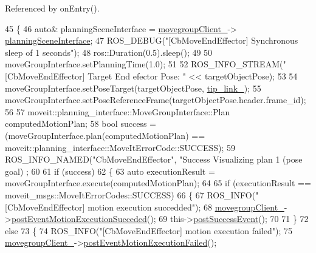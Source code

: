Referenced by on\+Entry().


\begin{DoxyCode}
45 \{
46   \textcolor{keyword}{auto}& planningSceneInterface = \hyperlink{classcl__move__group__interface_1_1CbMoveEndEffector_a86583cb37788b461fc8bb38102a8c0ed}{movegroupClient\_}->
      \hyperlink{classcl__move__group__interface_1_1ClMoveGroup_a11bfab580f36e2ad32c9b37d6f58f44c}{planningSceneInterface};
47   ROS\_DEBUG(\textcolor{stringliteral}{"[CbMoveEndEffector] Synchronous sleep of 1 seconds"});
48   ros::Duration(0.5).sleep();
49 
50   moveGroupInterface.setPlanningTime(1.0);
51 
52   ROS\_INFO\_STREAM(\textcolor{stringliteral}{"[CbMoveEndEffector] Target End efector Pose: "} << targetObjectPose);
53 
54   moveGroupInterface.setPoseTarget(targetObjectPose, \hyperlink{classcl__move__group__interface_1_1CbMoveEndEffector_a4b6f4468b2db565a07119ac90c067436}{tip\_link\_});
55   moveGroupInterface.setPoseReferenceFrame(targetObjectPose.header.frame\_id);
56 
57   moveit::planning\_interface::MoveGroupInterface::Plan computedMotionPlan;
58   \textcolor{keywordtype}{bool} success = (moveGroupInterface.plan(computedMotionPlan) == 
      moveit::planning\_interface::MoveItErrorCode::SUCCESS);
59   ROS\_INFO\_NAMED(\textcolor{stringliteral}{"CbMoveEndEffector"}, \textcolor{stringliteral}{"Success Visualizing plan 1 (pose goal) %
      ;
60 
61   \textcolor{keywordflow}{if} (success)
62   \{
63     \textcolor{keyword}{auto} executionResult = moveGroupInterface.execute(computedMotionPlan);
64 
65     \textcolor{keywordflow}{if} (executionResult == moveit\_msgs::MoveItErrorCodes::SUCCESS)
66     \{
67       ROS\_INFO(\textcolor{stringliteral}{"[CbMoveEndEffector] motion execution succedded"});
68       \hyperlink{classcl__move__group__interface_1_1CbMoveEndEffector_a86583cb37788b461fc8bb38102a8c0ed}{movegroupClient\_}->\hyperlink{classcl__move__group__interface_1_1ClMoveGroup_aebaf269db373d41837bae87651458e54}{postEventMotionExecutionSucceded}();
69       this->\hyperlink{classsmacc_1_1SmaccAsyncClientBehavior_adf18efe1f0e4eacc1277b8865a8a94b1}{postSuccessEvent}();
70 
71     \}
72     \textcolor{keywordflow}{else}
73     \{
74       ROS\_INFO(\textcolor{stringliteral}{"[CbMoveEndEffector] motion execution failed"});
75       \hyperlink{classcl__move__group__interface_1_1CbMoveEndEffector_a86583cb37788b461fc8bb38102a8c0ed}{movegroupClient\_}->\hyperlink{classcl__move__group__interface_1_1ClMoveGroup_a39dc3871d29b2af1ab739057f6ca6daa}{postEventMotionExecutionFailed}();
}
\end{DoxyCode}
